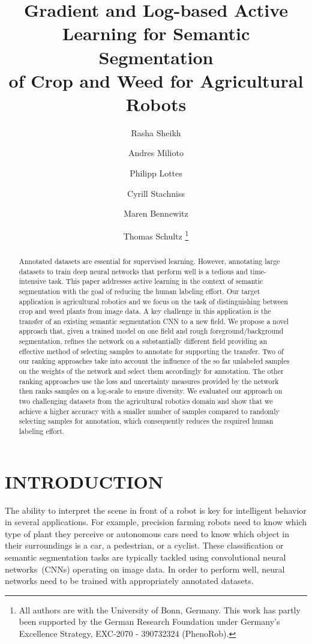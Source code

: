 \documentclass[letterpaper, 10 pt, conference]{ieeeconf}  %
\title{\LARGE \bf Gradient and Log-based Active Learning for Semantic Segmentation \\of Crop and Weed for Agricultural Robots}
\author{Rasha Sheikh \and Andres Milioto \and Philipp Lottes \and Cyrill Stachniss \and Maren Bennewitz \and Thomas Schultz%
  \thanks{All authors are with the University of
    Bonn, Germany. This work has partly been supported by the German Research Foundation under Germany's Excellence Strategy, EXC-2070 - 390732324 (PhenoRob).}%
}
\begin{document}
\maketitle
\thispagestyle{empty} 
\pagestyle{empty}


\begin{abstract}
Annotated datasets are essential for supervised learning. However, annotating
large datasets to  train deep neural networks that perform well is a tedious
and time-intensive task. This paper  addresses active learning in the context
of semantic segmentation with the goal of reducing the  human labeling effort.
Our target application is agricultural robotics and we focus on the task of
distinguishing between crop and weed plants from image data. A key challenge in this
application is the  transfer of an existing semantic segmentation CNN to a new
field. We propose a novel approach that, given a trained model on one field and rough foreground/background segmentation,
refines the network on a substantially different field  providing an effective
method of selecting samples to annotate for supporting the transfer. Two of our ranking approaches take
 into account the influence of the so far unlabeled samples on the
weights of the network and select them accordingly for annotation. The other ranking approaches 
use the loss and uncertainty measures provided by the network then ranks samples on a log-scale to ensure diversity.
We evaluated our approach on two challenging  datasets from the agricultural
robotics domain and show that we achieve a higher accuracy with a  smaller
number of samples compared to randomly selecting samples for annotation, which consequently reduces the required human labeling  effort.

\end{abstract} 

\section{INTRODUCTION}
\label{sec:intro}

The ability to  interpret the scene in front of a robot is key for
intelligent behavior in several applications. For example, precision farming
robots need to know which type of plant they perceive or autonomous cars need to
know  which object in their surroundings is a car, a pedestrian, or a
cyclist. These  classification or semantic segmentation tasks are typically
tackled using  convolutional neural networks~(CNNs) operating on  image data.
In order to perform  well, neural networks need to be trained with
appropriately annotated datasets.
\end{document}
